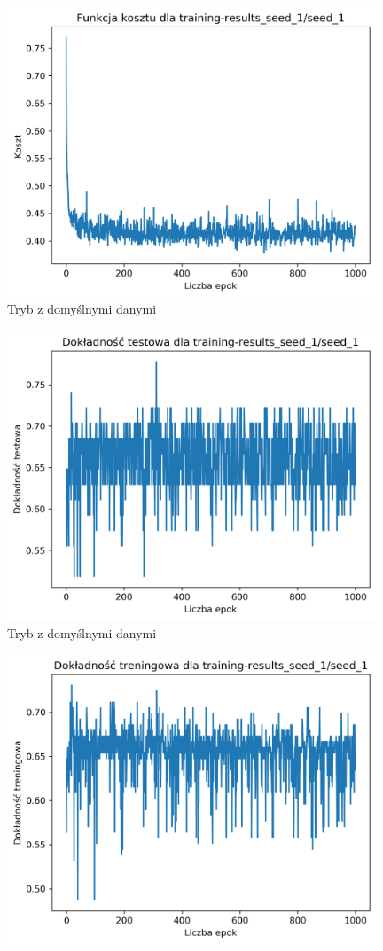 \documentclass{classrep}
\begin{document}
{{{                \begin{figure}[!htbp]
                    \centering
                    \includegraphics[width=110mm]{wykresy/seed_1_cost.png}
                    \caption{Tryb z domyślnymi danymi}
                \end{figure}
                \begin{figure}[!htbp]
                    \centering
                    \includegraphics[width=110mm]{wykresy/seed_1_testing-accuracy.png}
                    \caption{Tryb z domyślnymi danymi}
                \end{figure}
                \begin{figure}[!htbp]
                    \centering
                    \includegraphics[width=110mm]{wykresy/seed_1_training-accuracy.png}

\end{figure}}}}
\end{document}
